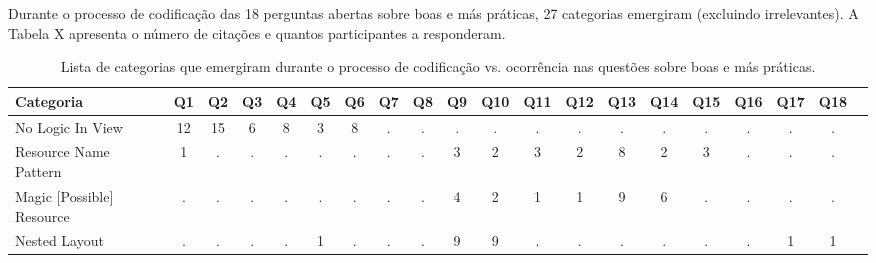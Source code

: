 Durante o processo de codificação das 18 perguntas abertas sobre boas e más práticas, 27 categorias emergiram (excluindo irrelevantes). A Tabela X apresenta o número de citações e quantos participantes a responderam. 


\begin{table*}[t]
\centering
\caption{Lista de categorias que emergiram durante o processo de codifica\c{c}\~ao vs. ocorr\^encia nas quest\~oes sobre boas e m\'as pr\'aticas.}
\small
\begin{tabular}{p{4cm}|p{.3cm}p{.3cm}p{.3cm}p{.3cm}p{.3cm}p{.3cm}p{.3cm}p{.3cm}p{.3cm}p{.4cm}p{.4cm}p{.4cm}p{.4cm}p{.4cm}p{.4cm}p{.4cm}p{.4cm}p{.4cm}p{.4cm}}
\toprule
\textbf{Categoria} & Q1 & Q2 & Q3 & Q4 & Q5 & Q6 & Q7 & Q8 & Q9 & Q10 & Q11 & Q12 & Q13 & Q14 & Q15 & Q16 & Q17 & Q18 \\
\hline
No Logic In View									& \multicolumn{1}{c}{12}	& \multicolumn{1}{c}{15}	& \multicolumn{1}{c}{6}	& \multicolumn{1}{c}{8}	& \multicolumn{1}{c}{3}	& \multicolumn{1}{c}{8}	& \multicolumn{1}{c}{.}	& \multicolumn{1}{c}{.}	& \multicolumn{1}{c}{.}	& \multicolumn{1}{c}{.}	& \multicolumn{1}{c}{.}	& \multicolumn{1}{c}{.}	& \multicolumn{1}{c}{.}	& \multicolumn{1}{c}{.}	& \multicolumn{1}{c}{.}	& \multicolumn{1}{c}{.}	& \multicolumn{1}{c}{.}	& \multicolumn{1}{c}{.}  \\
Resource Name Pattern								& \multicolumn{1}{c}{1}	& \multicolumn{1}{c}{.}	& \multicolumn{1}{c}{.}	& \multicolumn{1}{c}{.}	& \multicolumn{1}{c}{.}	& \multicolumn{1}{c}{.}	& \multicolumn{1}{c}{.}	& \multicolumn{1}{c}{.}	& \multicolumn{1}{c}{3}	& \multicolumn{1}{c}{2}	& \multicolumn{1}{c}{3}	& \multicolumn{1}{c}{2}	& \multicolumn{1}{c}{8}	& \multicolumn{1}{c}{2}	& \multicolumn{1}{c}{3}	& \multicolumn{1}{c}{.}	& \multicolumn{1}{c}{.}	& \multicolumn{1}{c}{.} 		 \\
Magic [Possible] Resource							& \multicolumn{1}{c}{.}	& \multicolumn{1}{c}{.}	& \multicolumn{1}{c}{.}	& \multicolumn{1}{c}{.}	& \multicolumn{1}{c}{.}	& \multicolumn{1}{c}{.}	& \multicolumn{1}{c}{.}	& \multicolumn{1}{c}{.}	& \multicolumn{1}{c}{4}	& \multicolumn{1}{c}{2}	& \multicolumn{1}{c}{1}	& \multicolumn{1}{c}{1}	& \multicolumn{1}{c}{9}	& \multicolumn{1}{c}{6}	& \multicolumn{1}{c}{.}	& \multicolumn{1}{c}{.}	& \multicolumn{1}{c}{.}	& \multicolumn{1}{c}{.} 		 \\
Nested Layout										& \multicolumn{1}{c}{.}	& \multicolumn{1}{c}{.}	& \multicolumn{1}{c}{.}	& \multicolumn{1}{c}{.}	& \multicolumn{1}{c}{1}	& \multicolumn{1}{c}{.}	& \multicolumn{1}{c}{.}	& \multicolumn{1}{c}{.}	& \multicolumn{1}{c}{9}	& \multicolumn{1}{c}{9}	& \multicolumn{1}{c}{.}	& \multicolumn{1}{c}{.}	& \multicolumn{1}{c}{.}	& \multicolumn{1}{c}{.}	& \multicolumn{1}{c}{.}	& \multicolumn{1}{c}{.}	& \multicolumn{1}{c}{1}	& \multicolumn{1}{c}{1} 		 \\

\end{tabular}
\end{table*}

